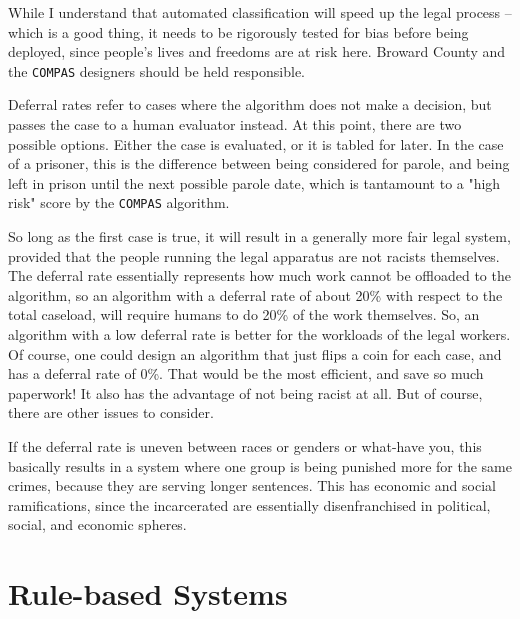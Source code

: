 \documentclass[11pt,largemargins, anonymous]{homework}
\begin{document}
\begin{arabicparts}
    While I understand that automated classification will speed up the legal process -- which is a good thing,
    it needs to be rigorously tested for bias before being deployed,
    since people's lives and freedoms are at risk here.
    Broward County and the \texttt{COMPAS} designers should be held responsible.

    \questionpart

    Deferral rates refer to cases where the algorithm does not make a decision,
    but passes the case to a human evaluator instead.
    At this point, there are two possible options.
    Either the case is evaluated, or it is tabled for later.
    In the case of a prisoner, this is the difference between being considered for parole,
    and being left in prison until the next possible parole date,
    which is tantamount to a "high risk" score by the \texttt{COMPAS} algorithm.

    So long as the first case is true, it will result in a generally more fair legal system,
    provided that the people running the legal apparatus are not racists themselves.
    The deferral rate essentially represents how much work cannot be offloaded to the algorithm,
    so an algorithm with a deferral rate of about 20\% with respect to the total caseload,
    will require humans to do 20\% of the work themselves.
    So, an algorithm with a low deferral rate is better for the workloads of the legal workers.
    Of course, one could design an algorithm that just flips a coin for each case,
    and has a deferral rate of 0\%.
    That would be the most efficient, and save so much paperwork!
    It also has the advantage of not being racist at all.
    But of course, there are other issues to consider.

    If the deferral rate is uneven between races or genders or what-have you,
    this basically results in a system where one group is being punished more for the same crimes,
    because they are serving longer sentences.
    This has economic and social ramifications,
    since the incarcerated are essentially disenfranchised in political, social, and economic spheres.

    \questionpart



\end{arabicparts}

\part{Rule-based Systems}
\end{document}
